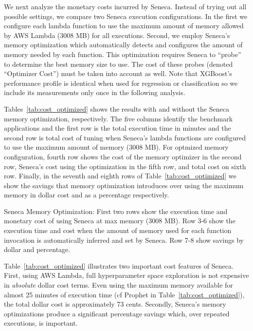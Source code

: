 We next analyze the monetary costs incurred by Seneca. Instead of trying out all possible settings,  we compare two
Seneca execution configurations.  In the first 
we configure each lambda function to
use the maximum amount of memory allowed by AWS Lambda (3008 MB) for all
executions.
Second, we employ Seneca's memory optimization which automatically detects and configures
the amount of memory needed by each function.  This optimization requires
Seneca to ``probe'' to determine the best memory size to use.  The
cost of these probes
(denoted ``Optimizer Cost'') must be taken into account as well.
Note that XGBoost's performance profile is identical when used for regression
or classification so we include its measurements only once in the following
analysis.



Tables~\ref{tab:cost_optimized} shows the results with and without 
the Seneca memory optimization, respectively. The five columns identify the benchmark applications and the first row is the total execution time in minutes and the second row is total cost of tuning when Seneca's lambda functions are configured to use the maximum amount of memory (3008 MB). For optmized memory configuration, fourth row shows the cost of the memory optimizer in the
second row, Seneca's cost using the optimization in the fifth row, and total cost on sixth row.
Finally, in the seventh and eighth rows of Table~\ref{tab:cost_optimized} we show the
savings that memory optimization introduces over using the maximum memory in dollar cost and as a percentage respectively.   

\begin{table}
\centering

\caption{Seneca Memory Optimization: First two rows show the execution time and  monetary cost of using Seneca at max memory (3008 MB). Row 3-6 show the execution time and cost when the amount of memory used for each function invocation is automatically inferred and set by Seneca. Row 7-8 show savings by dollar and percentage.
\label{tab:cost_optimized}}
\vspace{-0.2in}
\end{table}

Table~\ref{tab:cost_optimized} illustrates two important cost features of Seneca.  First, using
AWS Lambda, full hyperparameter space exploration is not expensive in 
\textit{absolute} dollar cost terms.  Even using the maximum memory available
for almost 25 minutes of execution time (cf Prophet in Table~\ref{tab:cost_optimized}), the
total dollar cost is approximately 73 cents.  Secondly, Seneca's memory
optimizations produce a significant percentage savings which, over repeated
executions, is important.  

